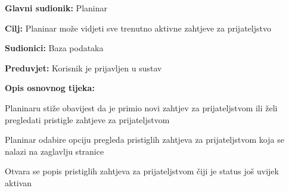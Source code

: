 		\noindent {}
		\begin{packed_item}
			
			\item \textbf{Glavni sudionik: }$ $Planinar$ $
			\item  \textbf{Cilj:} $ $Planinar može vidjeti sve trenutno aktivne zahtjeve za prijateljstvo $ $
			\item  \textbf{Sudionici:} $ $Baza podataka $ $
			\item  \textbf{Preduvjet:} $ $Korisnik je prijavljen u sustav$ $
			\item  \textbf{Opis osnovnog tijeka:}
			
			\item[] \begin{packed_enum}
				
				\item $ $Planinaru stiže obavijest da je primio novi zahtjev za prijateljstvom ili želi pregledati pristigle zahtjeve za prijateljstvom $ $
				\item $ $Planinar odabire opciju pregleda pristiglih zahtjeva za prijateljstvom koja se nalazi na zaglavlju stranice$ $
				\item $ $Otvara se popis pristiglih zahtjeva za prijateljstvom čiji je status još uvijek aktivan$ $
				
			\end{packed_enum}
		\end{packed_item}
	

